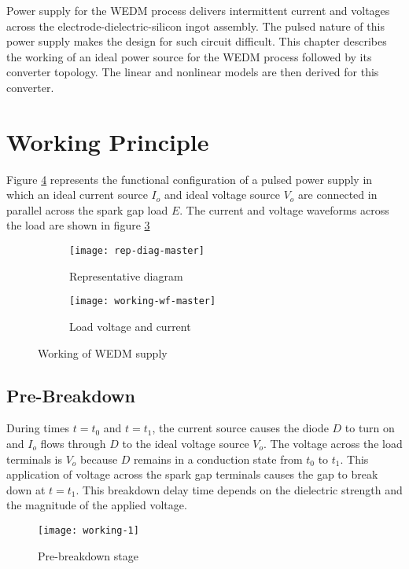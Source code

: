 \label{chap:modelling}
Power supply for the WEDM process delivers intermittent current and voltages across the electrode-dielectric-silicon ingot assembly. The pulsed nature of this power supply makes the design for such circuit difficult. This chapter describes the working of an ideal power source for the WEDM process followed by its converter topology. The linear and nonlinear models are then derived for this converter.

\section{Working Principle}
	Figure \ref{fig:working-1} represents the functional configuration of a pulsed power supply in which an ideal current source $I_o$ and ideal voltage source $V_o$ are connected in parallel across the spark gap load $E$. The current and voltage waveforms across the load are shown in figure \ref{fig:working-2}
	\begin{figure}[H]
		\begin{subfigure}{0.49\textwidth}
			\vspace{0.5cm}
			\centering
			\texttt{[image: rep-diag-master]}
			\caption{Representative diagram}
			\label{fig:working-1}
		\end{subfigure}
		\begin{subfigure}{0.49\textwidth}
			\centering
			\texttt{[image: working-wf-master]}
			\caption{Load voltage and current}
			\label{fig:working-2}
		\end{subfigure}
		\caption{Working of WEDM supply}
	\end{figure}

\subsection{Pre-Breakdown}
	During times $t=t_0$ and $t=t_1$, the current source causes the diode $D$ to turn on and $I_o$ flows through $D$ to the ideal voltage source $V_o$. The voltage across the load terminals is $V_o$ because $D$ remains in a conduction state from $t_0$ to $t_1$. This application of voltage across the spark gap terminals causes the gap to break down at $t=t_1$. This breakdown delay time depends on the dielectric strength and the magnitude of the applied voltage.
	\begin{figure}[H]
		\centering
		\texttt{[image: working-1]}
		\caption{Pre-breakdown stage}
		\label{fig:working-1}
	\end{figure}

